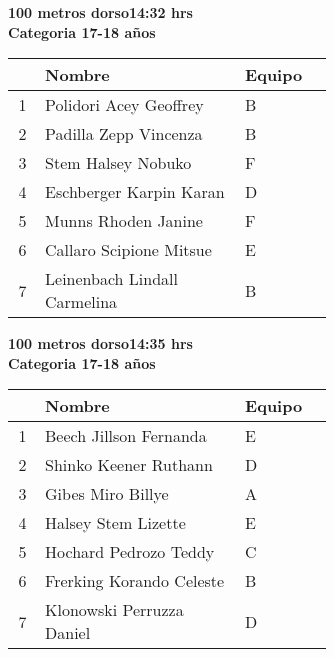 \begin{minipage}{0.95\linewidth}\vspace{0.5cm} 
\begin{flushleft}
\textbf{
\hspace{-0.15cm}100 metros dorso\hspace{1.5cm}14:32 hrs \\Categoria 17-18 años}\vspace{-0.2cm} 
\end{flushleft}
\begin{tabular}{cp{0.63\linewidth}l}
\hline
& \textbf{Nombre} & \textbf{Equipo} \\ \hline
1 & Polidori Acey Geoffrey & B \\ 
2 & Padilla Zepp Vincenza & B \\ 
3 & Stem Halsey Nobuko & F \\ 
4 & Eschberger Karpin Karan & D \\ 
5 & Munns Rhoden Janine & F \\ 
6 & Callaro Scipione Mitsue & E \\ 
7 & Leinenbach Lindall Carmelina & B \\ 
\end{tabular}
\end{minipage}
\begin{minipage}{0.95\linewidth}\vspace{0.5cm} 
\begin{flushleft}
\textbf{
\hspace{-0.15cm}100 metros dorso\hspace{1.5cm}14:35 hrs \\Categoria 17-18 años}\vspace{-0.2cm} 
\end{flushleft}
\begin{tabular}{cp{0.63\linewidth}l}
\hline
& \textbf{Nombre} & \textbf{Equipo} \\ \hline
1 & Beech Jillson Fernanda & E \\ 
2 & Shinko Keener Ruthann & D \\ 
3 & Gibes Miro Billye & A \\ 
4 & Halsey Stem Lizette & E \\ 
5 & Hochard Pedrozo Teddy & C \\ 
6 & Frerking Korando Celeste & B \\ 
7 & Klonowski Perruzza Daniel & D \\ 
\end{tabular}
\end{minipage}
